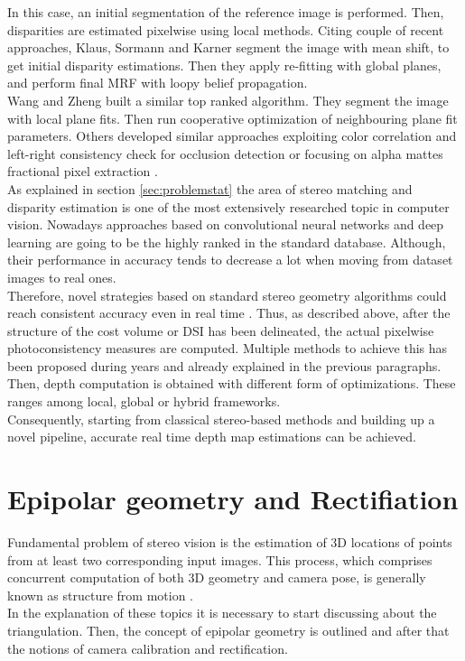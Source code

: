 In this case, an initial segmentation of the reference image is performed.
Then, disparities are estimated pixelwise using local methods.
Citing couple of recent approaches, Klaus, Sormann and Karner \citep{Klaus2006} segment the image with mean shift, to get initial disparity estimations. 
Then they apply re-fitting with global planes, and perform final MRF with loopy belief propagation. \\
Wang and Zheng \citep{Wang2008} built a similar top ranked algorithm.
They segment the image with local plane fits. 
Then run cooperative optimization of neighbouring plane fit parameters. 
Others developed similar approaches exploiting color correlation and left-right consistency check for occlusion detection \citep{yang2008stereo} or focusing on alpha mattes fractional pixel extraction \citep{bleyer2009stereo}.\\
As explained in section \ref{sec:problemstat} the area of stereo matching and disparity estimation is one of the most extensively researched topic in computer vision.
Nowadays approaches based on convolutional neural networks and deep learning are going to be the highly ranked in the standard database.
Although, their performance in accuracy tends to decrease a lot when moving from dataset images to real ones.\\
Therefore, novel strategies based on standard stereo geometry algorithms could reach consistent accuracy even in real time \citep{Hernandez-Juarez2016}.
Thus, as described above, after the structure of the cost volume or DSI has been delineated, the actual pixelwise photoconsistency measures are computed.
Multiple methods to achieve this has been proposed during years and already explained in the previous paragraphs.
Then, depth computation is obtained with different form of optimizations. 
These ranges among local, global or hybrid frameworks. \\
Consequently, starting from classical stereo-based methods and building up a novel pipeline, accurate real time depth map estimations can be achieved.




\section{Epipolar geometry and Rectifiation}
\label{sec:eipolarandrect}

Fundamental problem of stereo vision is the estimation of 3D locations of points from at least two corresponding input images.
This process, which comprises concurrent computation of both 3D geometry and camera pose, is generally known as structure from motion \cite{Szeliski2011}.\\
In the explanation of these topics it is necessary to start discussing about the triangulation.
Then, the concept of epipolar geometry is outlined and after that the notions of camera calibration and rectification. 

